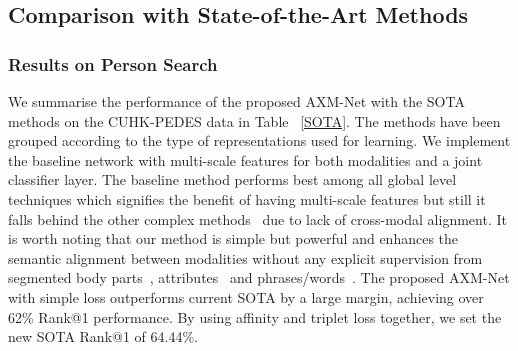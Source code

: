\documentclass[letterpaper]{article} \usepackage{aaai22}  \usepackage{times}  \usepackage{helvet}  \usepackage{courier}  \usepackage[hyphens]{url}  \usepackage{graphicx} \urlstyle{rm} \def\UrlFont{\rm}  \usepackage{natbib}  \usepackage{caption} \DeclareCaptionStyle{ruled}{labelfont=normalfont,labelsep=colon,strut=off} \frenchspacing  \setlength{\pdfpagewidth}{8.5in}  \setlength{\pdfpageheight}{11in}  \usepackage{algorithm}
\begin{document}
\subsection{Comparison with State-of-the-Art Methods}
\subsubsection{Results on Person Search}
We summarise the performance of the proposed AXM-Net with the SOTA methods on the CUHK-PEDES data in Table ~\ref{SOTA}. The methods have been grouped according to the type of representations used for learning. We implement the baseline network with multi-scale features for both modalities and a joint classifier layer. The baseline method performs best among all global level techniques which signifies the benefit of having multi-scale features but still it falls behind the other complex methods~\cite{wang2020vitaa,aggarwal2020text,wang2020img,gumbel2020} due to lack of cross-modal alignment.
It is worth noting that our method is simple but powerful and enhances the semantic alignment between modalities without any explicit supervision from segmented body parts~\cite{wang2020vitaa}, attributes~\cite{aggarwal2020text} and phrases/words~\cite{gumbel2020}. The proposed AXM-Net with simple  loss outperforms current SOTA by a large margin, achieving over 62\% Rank@1 performance. By using affinity and triplet loss together, we set the new SOTA Rank@1 of 64.44\%.

\begingroup
\begin{table*}[]
\caption{Performance comparison on cross-modal Re-ID. Query  Gallery}
\label{crossModal}
\end{table*}
\endgroup
\end{document}
